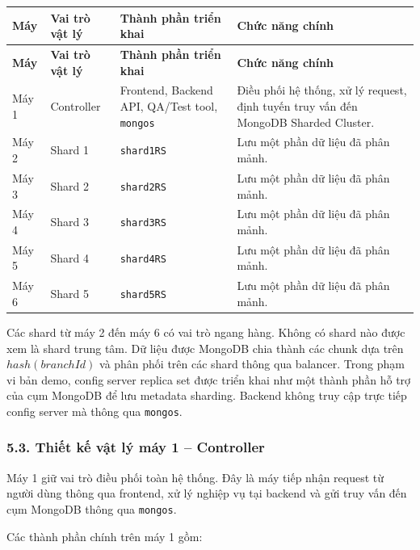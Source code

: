 \documentclass[12pt,a4paper]{article}
\begin{document}
\begin{center}
\small
\begin{longtable}{|p{1.4cm}|p{2.1cm}|p{3.3cm}|p{5.8cm}|}
\hline
\textbf{Máy} & \textbf{Vai trò vật lý} & \textbf{Thành phần triển khai} & \textbf{Chức năng chính} \\ \hline
\endfirsthead
\hline
\textbf{Máy} & \textbf{Vai trò vật lý} & \textbf{Thành phần triển khai} & \textbf{Chức năng chính} \\ \hline
\endhead
Máy 1 & Controller & Frontend, Backend API, QA/Test tool, \texttt{mongos} & Điều phối hệ thống, xử lý request, định tuyến truy vấn đến MongoDB Sharded Cluster. \\ \hline
Máy 2 & Shard 1 & \texttt{shard1RS} & Lưu một phần dữ liệu đã phân mảnh. \\ \hline
Máy 3 & Shard 2 & \texttt{shard2RS} & Lưu một phần dữ liệu đã phân mảnh. \\ \hline
Máy 4 & Shard 3 & \texttt{shard3RS} & Lưu một phần dữ liệu đã phân mảnh. \\ \hline
Máy 5 & Shard 4 & \texttt{shard4RS} & Lưu một phần dữ liệu đã phân mảnh. \\ \hline
Máy 6 & Shard 5 & \texttt{shard5RS} & Lưu một phần dữ liệu đã phân mảnh. \\ \hline
\end{longtable}
\normalsize
\end{center}

Các shard từ máy 2 đến máy 6 có vai trò ngang hàng. Không có shard nào được xem là shard trung tâm. Dữ liệu được MongoDB chia thành các chunk dựa trên $hash(branchId)$ và phân phối trên các shard thông qua balancer. Trong phạm vi bản demo, config server replica set được triển khai như một thành phần hỗ trợ của cụm MongoDB để lưu metadata sharding. Backend không truy cập trực tiếp config server mà thông qua \texttt{mongos}.

\subsubsection*{5.3. Thiết kế vật lý máy 1 -- Controller}

Máy 1 giữ vai trò điều phối toàn hệ thống. Đây là máy tiếp nhận request từ người dùng thông qua frontend, xử lý nghiệp vụ tại backend và gửi truy vấn đến cụm MongoDB thông qua \texttt{mongos}.

Các thành phần chính trên máy 1 gồm:
\end{document}
